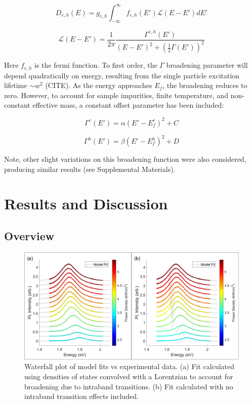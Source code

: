 \documentclass[aps,prb,preprint,groupedaddress]{revtex4-2}
\begin{document}
\begin{equation} \label{Lorentzian Convolution}
D_{e,h}(E) = g_{e,h} \int_{-\infty}^\infty f_{e,h}(E') \mathcal{L}(E - E') dE'
\end{equation}

\begin{equation} \label{Lorentzian Term}
\mathcal{L}(E - E') = \frac{1}{2\pi} \frac{\Gamma^{e,h}(E')}{(E - E')^2 + (\frac{1}{2} \Gamma(E'))^2}
\end{equation}

Here $f_{e,h}$ is the fermi function. To first order, the $\Gamma$ broadening parameter will depend quadratically on energy, resulting from the single particle excitation lifetime $\sim w^2$ (CITE). As the energy approaches $E_f$, the broadening reduces to zero. However, to account for sample impurities, finite temperature, and non-constant effective mass, a constant offset parameter has been included:

\begin{equation} \label{Gamma factor}
\Gamma^{e}(E') = \alpha(E' - E_f^{e})^2 + C
\end{equation}

\begin{equation} \label{Gamma factor}
\Gamma^{h}(E') = \beta(E' - E_f^{h})^2 + D
\end{equation}

Note, other slight variations on this broadening function were also considered, producing similar results (see Supplemental Materials).

\section{Results and Discussion}

\subsection{Overview}

\begin{figure}
	\includegraphics[width=1\linewidth]{fig_fitwith&withoutL.png}
	\caption{Waterfall plot of model fits vs experimental data. (a) Fit calculated using densities of states convolved with a Lorentzian to account for broadening due to intraband transitions. (b) Fit calculated with no intraband transition effects included.}
	\label{fig:result_data}
\end{figure}
\end{document}
